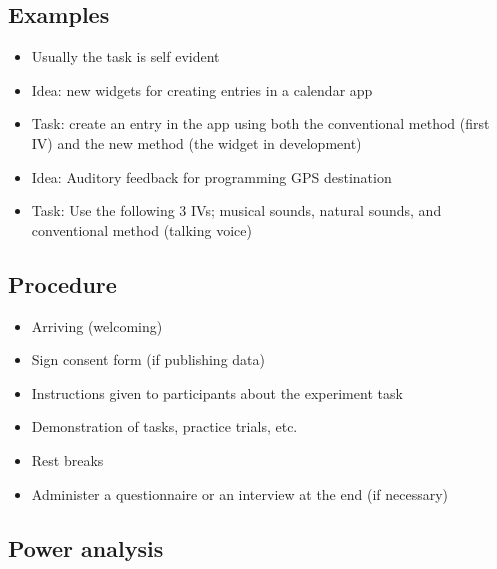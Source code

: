 \documentclass[12pt]{book}
\begin{document}
\subsection*{Examples}
\begin{itemize}
  \item Usually the task is self evident
  \item Idea: new widgets for creating entries in a calendar app
  \item Task: create an entry in the app using both the conventional method (first IV) and the new method (the widget in development)
  \item Idea: Auditory feedback for programming GPS destination
  \item Task: Use the following 3 IVs; musical sounds, natural sounds, and conventional method (talking voice)
\end{itemize}

\subsection*{Procedure}
\begin{itemize}
  \item Arriving (welcoming)
  \item Sign consent form (if publishing data)
  \item Instructions given to participants about the experiment task
  \item Demonstration of tasks, practice trials, etc.
  \item Rest breaks
  \item Administer a questionnaire or an interview at the end (if necessary)
\end{itemize}

\subsection*{Power analysis}
\end{document}
